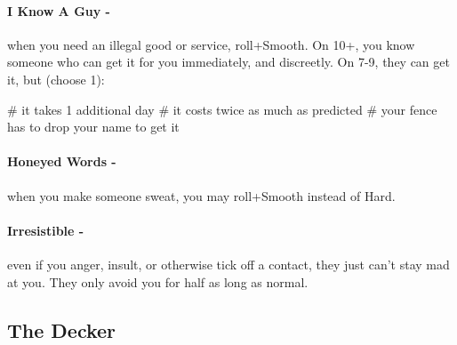 \paragraph{I Know A Guy -} when you need an illegal good or service, roll+Smooth. On 10+, you know someone who can get it for you immediately, and discreetly. On 7-9, they can get it, but (choose 1):
    \begin{easylist}
        # it takes 1 additional day
        # it costs twice as much as predicted
        # your fence has to drop your name to get it
    \end{easylist}

\paragraph{Honeyed Words -} when you make someone sweat, you may roll+Smooth instead of Hard.

\paragraph{Irresistible -} even if you anger, insult, or otherwise tick off a contact, they just can’t stay mad at you. They only avoid you for half as long as normal.



\clearpage
\subsection{The Decker}

